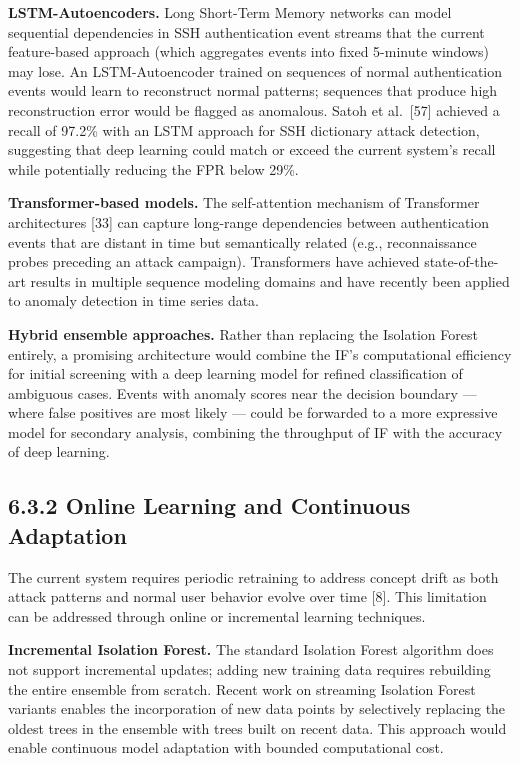\documentclass[
  a4paper]{report}
\begin{document}
\textbf{LSTM-Autoencoders.} Long Short-Term Memory networks can model
sequential dependencies in SSH authentication event streams that the
current feature-based approach (which aggregates events into fixed
5-minute windows) may lose. An LSTM-Autoencoder trained on sequences of
normal authentication events would learn to reconstruct normal patterns;
sequences that produce high reconstruction error would be flagged as
anomalous. Satoh et al.~{[}57{]} achieved a recall of 97.2\% with an
LSTM approach for SSH dictionary attack detection, suggesting that deep
learning could match or exceed the current system's recall while
potentially reducing the FPR below 29\%.

\textbf{Transformer-based models.} The self-attention mechanism of
Transformer architectures {[}33{]} can capture long-range dependencies
between authentication events that are distant in time but semantically
related (e.g., reconnaissance probes preceding an attack campaign).
Transformers have achieved state-of-the-art results in multiple sequence
modeling domains and have recently been applied to anomaly detection in
time series data.

\textbf{Hybrid ensemble approaches.} Rather than replacing the Isolation
Forest entirely, a promising architecture would combine the IF's
computational efficiency for initial screening with a deep learning
model for refined classification of ambiguous cases. Events with anomaly
scores near the decision boundary --- where false positives are most
likely --- could be forwarded to a more expressive model for secondary
analysis, combining the throughput of IF with the accuracy of deep
learning.

\subsection{6.3.2 Online Learning and Continuous
Adaptation}\label{online-learning-and-continuous-adaptation}

The current system requires periodic retraining to address concept drift
as both attack patterns and normal user behavior evolve over time
{[}8{]}. This limitation can be addressed through online or incremental
learning techniques.

\textbf{Incremental Isolation Forest.} The standard Isolation Forest
algorithm does not support incremental updates; adding new training data
requires rebuilding the entire ensemble from scratch. Recent work on
streaming Isolation Forest variants enables the incorporation of new
data points by selectively replacing the oldest trees in the ensemble
with trees built on recent data. This approach would enable continuous
model adaptation with bounded computational cost.
\end{document}
